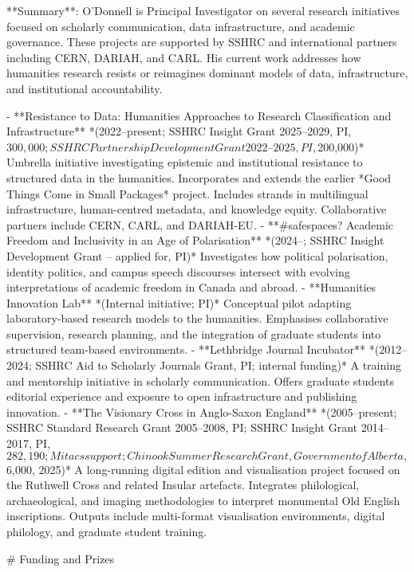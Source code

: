 **Summary**: O'Donnell is Principal Investigator on several research initiatives focused on scholarly communication, data infrastructure, and academic governance. These projects are supported by SSHRC and international partners including CERN, DARIAH, and CARL. His current work addresses how humanities research resists or reimagines dominant models of data, infrastructure, and institutional accountability.

- **Resistance to Data: Humanities Approaches to Research Classification and Infrastructure**
  *(2022–present; SSHRC Insight Grant 2025–2029, PI, $300,000; SSHRC Partnership Development Grant 2022–2025, PI, $200,000)*
  Umbrella initiative investigating epistemic and institutional resistance to structured data in the humanities. Incorporates and extends the earlier *Good Things Come in Small Packages* project. Includes strands in multilingual infrastructure, human-centred metadata, and knowledge equity. Collaborative partners include CERN, CARL, and DARIAH-EU.
- **#safespaces? Academic Freedom and Inclusivity in an Age of Polarisation**
  *(2024–; SSHRC Insight Development Grant – applied for, PI)*
  Investigates how political polarisation, identity politics, and campus speech discourses intersect with evolving interpretations of academic freedom in Canada and abroad.
- **Humanities Innovation Lab**
  *(Internal initiative; PI)*
  Conceptual pilot adapting laboratory-based research models to the humanities. Emphasises collaborative supervision, research planning, and the integration of graduate students into structured team-based environments.
- **Lethbridge Journal Incubator**
  *(2012–2024; SSHRC Aid to Scholarly Journals Grant, PI; internal funding)*
  A training and mentorship initiative in scholarly communication. Offers graduate students editorial experience and exposure to open infrastructure and publishing innovation.
- **The Visionary Cross in Anglo-Saxon England**
  *(2005–present; SSHRC Standard Research Grant 2005–2008, PI; SSHRC Insight Grant 2014–2017, PI, $282,190; Mitacs support; Chinook Summer Research Grant, Government of Alberta, $6,000, 2025)*
  A long-running digital edition and visualisation project focused on the Ruthwell Cross and related Insular artefacts. Integrates philological, archaeological, and imaging methodologies to interpret monumental Old English inscriptions. Outputs include multi-format visualisation environments, digital philology, and graduate student training.

\sectionbreak{}
# Funding and Prizes

